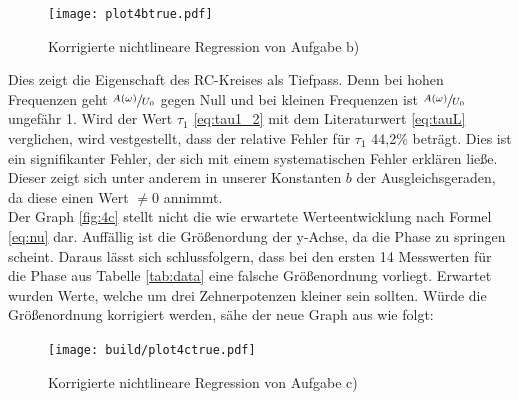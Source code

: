 
\begin{figure}[H]
    \texttt{[image: plot4btrue.pdf]}
    \centering
    \caption{Korrigierte nichtlineare Regression von Aufgabe b)}
    \label{fig:4btrue}
\end{figure}


Dies zeigt die Eigenschaft des RC-Kreises als Tiefpass.
Denn bei hohen Frequenzen geht $\sfrac{A(\omega)}{U_0}$ gegen Null und bei kleinen
Frequenzen ist $\sfrac{A(\omega)}{U_0}$ ungefähr 1.
Wird der Wert $\tau_1$ \eqref{eq:tau1_2} mit dem Literaturwert
\eqref{eq:tauL} verglichen, wird vestgestellt, dass der relative Fehler für $\tau_1$ 
44,2\% beträgt. Dies ist ein signifikanter Fehler, der sich mit einem  
systematischen Fehler erklären ließe. Dieser zeigt sich unter anderem 
in unserer Konstanten $b$ der Ausgleichsgeraden, da diese einen Wert $\ne 0$ 
annimmt. 
\\





Der Graph \ref{fig:4c} stellt nicht die wie erwartete Werteentwicklung nach Formel
\eqref{eq:nu} dar. Auffällig ist die Größenordung der y-Achse, da die Phase zu
springen scheint. Daraus lässt sich schlussfolgern, dass bei den ersten 14 Messwerten
für die Phase aus Tabelle \ref{tab:data} eine falsche Größenordnung vorliegt.
Erwartet wurden Werte, welche um drei Zehnerpotenzen kleiner sein sollten. 
Würde die Größenordnung korrigiert werden, sähe der neue Graph aus wie folgt:

  \begin{figure}[H]
    \texttt{[image: build/plot4ctrue.pdf]}
    \centering
    \caption{Korrigierte nichtlineare Regression von Aufgabe c)}
    \label{fig:4ctrue}
  \end{figure}

